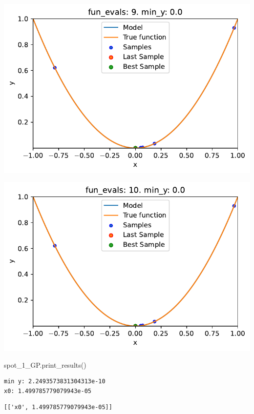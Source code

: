 \documentclass[
  letterpaper,
  DIV=11,
  numbers=noendperiod]{scrreprt}
\newenvironment{Shaded}{\begin{snugshade}}{\end{snugshade}}
\newcommand{\NormalTok}[1]{\textcolor[rgb]{0.00,0.23,0.31}{#1}}
\begin{document}
\includegraphics{010_num_spot_sklearn_surrogate_files/figure-pdf/cell-24-output-8.pdf}

\includegraphics{010_num_spot_sklearn_surrogate_files/figure-pdf/cell-24-output-9.pdf}

\begin{Shaded}
\begin{Highlighting}[]
\NormalTok{spot\_1\_GP.print\_results()}
\end{Highlighting}
\end{Shaded}

\begin{verbatim}
min y: 2.2493573831304313e-10
x0: 1.499785779079943e-05
\end{verbatim}

\begin{verbatim}
[['x0', 1.499785779079943e-05]]
\end{verbatim}
\end{document}
